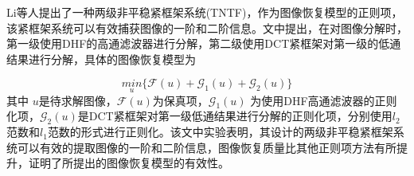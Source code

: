 

\par Li等人提出了一种两级非平稳紧框架系统(TNTF)\cite{li2021regularization}，作为图像恢复模型的正则项，该紧框架系统可以有效捕获图像的一阶和二阶信息。文中提出，在对图像分解时，第一级使用DHF\cite{li2016adaptive}的高通滤波器进行分解，第二级使用DCT紧框架对第一级的低通结果进行分解，具体的图像恢复模型为

\begin{equation}
	\underset{u}{min} \{ \mathcal{F}(u) + \mathcal{G}_{1}(u) + \mathcal{G}_{2}(u)\}
\end{equation}
其中 $u$是待求解图像，$\mathcal{F}(u)$为保真项，$\mathcal{G}_{1}(u)$ 为使用DHF高通滤波器的正则化项，$\mathcal{G}_{2}(u)$是DCT紧框架对第一级低通结果进行分解的正则化项，分别使用$l_2$范数和$l_1$范数的形式进行正则化。该文中实验表明，其设计的两级非平稳紧框架系统可以有效的提取图像的一阶和二阶信息，图像恢复质量比其他正则项方法有所提升，证明了所提出的图像恢复模型的有效性。

